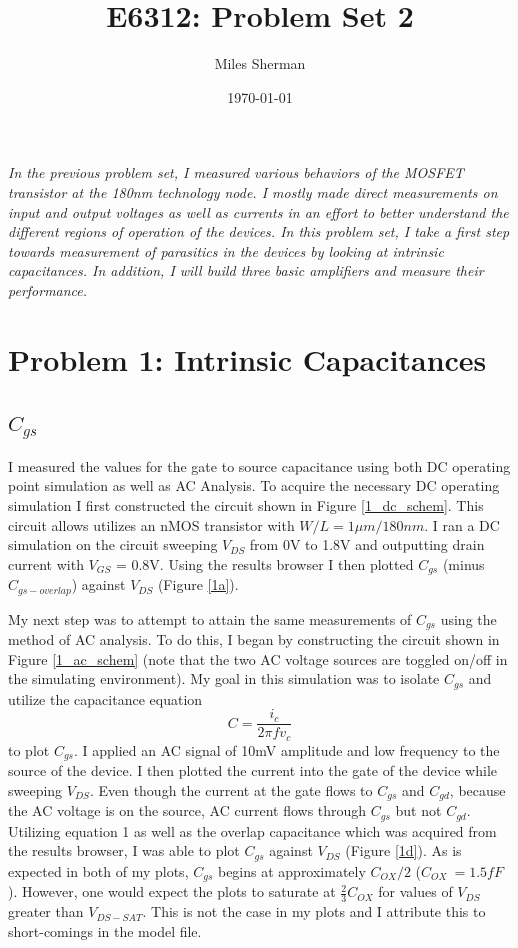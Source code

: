 \documentclass{article}
\begin{document}
\title{E6312: Problem Set 2}
\author{Miles Sherman}
\date{\today}
\maketitle

\textit{In the previous problem set, I measured various behaviors of the MOSFET transistor at the 180nm technology node. I mostly made direct measurements on input and output voltages as well as currents in an effort to better understand the different regions of operation of the devices. In this problem set, I take a first step towards measurement of parasitics in the devices by looking at intrinsic capacitances. In addition, I will build three basic amplifiers and measure their performance.}

\section{Problem 1: Intrinsic Capacitances}
\subsection{$C_{gs}$}
I measured the values for the gate to source capacitance using both DC operating point simulation as well as AC Analysis. To acquire the necessary DC operating simulation I first constructed the circuit shown in Figure \ref{1_dc_schem}. This circuit allows utilizes an nMOS transistor with $W/L = 1\mu m/180nm$. I ran a DC simulation on the circuit sweeping $V_{DS}$ from 0V to 1.8V and outputting drain current with $V_{GS}$ = 0.8V. Using the results browser I then plotted $C_{gs}$ (minus $C_{gs-overlap}$) against $V_{DS}$ (Figure \ref{1a}).

My next step was to attempt to attain the same measurements of $C_{gs}$ using the method of AC analysis. To do this, I began by constructing the circuit shown in Figure \ref{1_ac_schem} (note that the two AC voltage sources are toggled on/off in the simulating environment). My goal in this simulation was to isolate $C_{gs}$ and utilize the capacitance equation
\begin{equation}
C = \frac{i_c}{2\pi fv_c}
\end{equation}
to plot $C_{gs}$. I applied an AC signal of 10mV amplitude and low frequency to the source of the device. I then plotted the current into the gate of the device while sweeping $V_{DS}$. Even though the current at the gate flows to $C_{gs}$ and $C_{gd}$, because the AC voltage is on the source, AC current flows through $C_{gs}$ but not $C_{gd}$. Utilizing equation 1 as well as the overlap capacitance which was acquired from the results browser, I was able to plot $C_{gs}$ against $V_{DS}$ (Figure \ref{1d}). As is expected in both of my plots, $C_{gs}$ begins at approximately $C_{OX}/2$ ($C_{OX} ~= 1.5fF$). However, one would expect the plots to saturate at $\frac{2}{3} C_{OX}$ for values of $V_{DS}$ greater than $V_{DS-SAT}$. This is not the case in my plots and I attribute this to short-comings in the model file.
\end{document}

